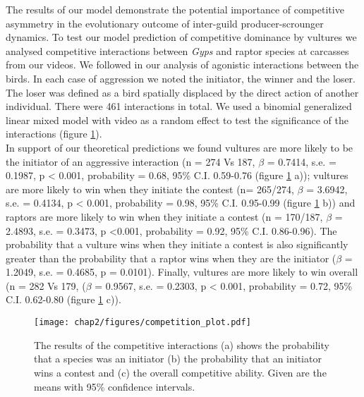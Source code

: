 The results of our model demonstrate the potential importance of competitive asymmetry in the evolutionary outcome of inter-guild producer-scrounger dynamics. To test our model prediction of competitive dominance by vultures we analysed competitive interactions between \textit{Gyps} and raptor species at carcasses from our videos. We followed \cite{bamford2010associations} in our analysis of agonistic interactions between the birds.  In each case of aggression we noted the initiator, the winner and the loser. The loser was defined as a bird spatially displaced by the direct action of another individual. 
There were 461 interactions in total. We used a binomial generalized linear mixed model with video as a random effect to test the significance of the interactions (figure \ref{fig:competition_plot}). \\ 
\indent
In support of our theoretical predictions we found vultures are more likely to be the initiator of an aggressive interaction (n = 274 Vs 187, $\beta$ = 0.7414, s.e. = 0.1987, p < 0.001, probability = 0.68, 95\% C.I. 0.59-0.76 (figure \ref{fig:competition_plot} a)); vultures are more likely to win when they initiate the contest (n= 265/274, $\beta$ = 3.6942, s.e. = 0.4134, p < 0.001, probability = 0.98, 95\% C.I. 0.95-0.99 (figure \ref{fig:competition_plot} b)) and raptors are more likely to win when they initiate a contest (n = 170/187, $\beta$ = 2.4893, s.e. = 0.3473, p <0.001, probability = 0.92, 95\% C.I. 0.86-0.96). The probability that a vulture wins when they initiate a contest is also significantly greater than the probability that a raptor wins when they are the initiator ($\beta$ = 1.2049, s.e. = 0.4685, p = 0.0101). Finally, vultures are more likely to win overall (n = 282 Vs 179, ($\beta$ = 0.9567, s.e. = 0.2303, p < 0.001, probability = 0.72, 95\% C.I. 0.62-0.80 (figure \ref{fig:competition_plot} c)).


\begin{figure}[H] %
	  \centering
	  \texttt{[image: chap2/figures/competition\_plot.pdf]}
	    \caption[Competitive interactions between vultures and raptors] %
	    {The results of the competitive interactions (a) shows the probability that a species was an initiator (b) the probability that an initiator wins a contest and (c) the overall competitive ability. Given are the means with 95\% confidence intervals.}%
	  \label{fig:competition_plot}
	\end{figure}
	
